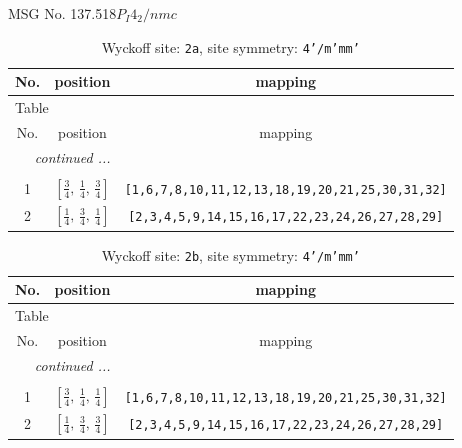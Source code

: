\documentclass[fleqn,8pt]{jsarticle}
\begin{document}
\setcounter{MaxMatrixCols}{32}

\renewcommand{\tablename}{Table~}
\renewcommand{\figurename}{Figure~}
\begin{center}
\LARGE
MSG No. 137.518\quad$P_{I}4_{2}/nmc$
\end{center}
\renewcommand{\arraystretch}{1.2}
\begin{longtable}{ccc}
\caption{Wyckoff site: {\tt 2a}, site symmetry: {\tt 4'/m'mm'}}
 \\
 \hline \hline
No. & position & mapping \\ \hline \endfirsthead

\multicolumn{2}{l}{\tablename\ \thetable{}} \\
 \hline \hline
No. & position & mapping \\ \hline \endhead

 \hline \hline
\multicolumn{2}{r}{\footnotesize\it continued ...} \\ \endfoot

 \hline \hline
\multicolumn{2}{r}{} \\ \endlastfoot

1 & $\left[ \frac{3}{4},\, \frac{1}{4},\, \frac{3}{4} \right]$ & {\tt [1,6,7,8,10,11,12,13,18,19,20,21,25,30,31,32]} \\ \hline
2 & $\left[ \frac{1}{4},\, \frac{3}{4},\, \frac{1}{4} \right]$ & {\tt [2,3,4,5,9,14,15,16,17,22,23,24,26,27,28,29]} \\
\end{longtable}
\renewcommand{\arraystretch}{1.2}
\begin{longtable}{ccc}
\caption{Wyckoff site: {\tt 2b}, site symmetry: {\tt 4'/m'mm'}}
 \\
 \hline \hline
No. & position & mapping \\ \hline \endfirsthead

\multicolumn{2}{l}{\tablename\ \thetable{}} \\
 \hline \hline
No. & position & mapping \\ \hline \endhead

 \hline \hline
\multicolumn{2}{r}{\footnotesize\it continued ...} \\ \endfoot

 \hline \hline
\multicolumn{2}{r}{} \\ \endlastfoot

1 & $\left[ \frac{3}{4},\, \frac{1}{4},\, \frac{1}{4} \right]$ & {\tt [1,6,7,8,10,11,12,13,18,19,20,21,25,30,31,32]} \\ \hline
2 & $\left[ \frac{1}{4},\, \frac{3}{4},\, \frac{3}{4} \right]$ & {\tt [2,3,4,5,9,14,15,16,17,22,23,24,26,27,28,29]} \\
\end{longtable}
\end{document}
